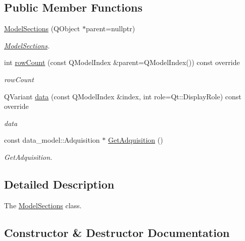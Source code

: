 \subsection*{Public Member Functions}
\begin{DoxyCompactItemize}
\item 
\hyperlink{class_model_sections_a50d8b404462b552f688abab957e32d79}{Model\+Sections} (Q\+Object $\ast$parent=nullptr)
\begin{DoxyCompactList}\small\item\em \hyperlink{class_model_sections}{Model\+Sections}. \end{DoxyCompactList}\item 
int \hyperlink{class_model_sections_ab23527240092e094ed0a135470fe2676}{row\+Count} (const Q\+Model\+Index \&parent=Q\+Model\+Index()) const override
\begin{DoxyCompactList}\small\item\em row\+Count \end{DoxyCompactList}\item 
Q\+Variant \hyperlink{class_model_sections_a3af1ab537c7c32526057ed46e6ac72d1}{data} (const Q\+Model\+Index \&index, int role=Qt\+::\+Display\+Role) const override
\begin{DoxyCompactList}\small\item\em data \end{DoxyCompactList}\item 
const data\+\_\+model\+::\+Adquisition $\ast$ \hyperlink{class_model_sections_a1fbcda847987cd5c44b0c542802c44c7}{Get\+Adquisition} ()
\begin{DoxyCompactList}\small\item\em Get\+Adquisition. \end{DoxyCompactList}\end{DoxyCompactItemize}


\subsection{Detailed Description}
The \hyperlink{class_model_sections}{Model\+Sections} class. 

\subsection{Constructor \& Destructor Documentation}
